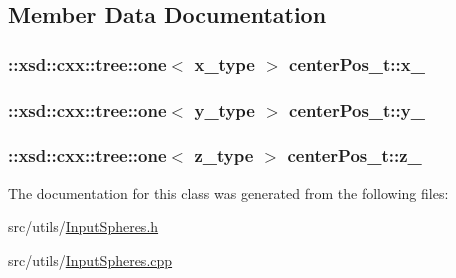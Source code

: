 \subsection{Member Data Documentation}
\hypertarget{classcenterPos__t_a17f007eddd609aec31759bf400c03dbb}{
\subsubsection[{x\-\_\-}]{\setlength{\rightskip}{0pt plus 5cm}\-::xsd\-::cxx\-::tree\-::one$<$ {\bf x\-\_\-type} $>$ center\-Pos\-\_\-t\-::x\-\_\-\hspace{0.3cm}{\ttfamily [protected]}}}\label{classcenterPos__t_a17f007eddd609aec31759bf400c03dbb}
\hypertarget{classcenterPos__t_a4e9b243a89175485826c3d57509fcaf8}{
\subsubsection[{y\-\_\-}]{\setlength{\rightskip}{0pt plus 5cm}\-::xsd\-::cxx\-::tree\-::one$<$ {\bf y\-\_\-type} $>$ center\-Pos\-\_\-t\-::y\-\_\-\hspace{0.3cm}{\ttfamily [protected]}}}\label{classcenterPos__t_a4e9b243a89175485826c3d57509fcaf8}
\hypertarget{classcenterPos__t_a51b70fc13ca57ea7638fbe292478f7de}{
\subsubsection[{z\-\_\-}]{\setlength{\rightskip}{0pt plus 5cm}\-::xsd\-::cxx\-::tree\-::one$<$ {\bf z\-\_\-type} $>$ center\-Pos\-\_\-t\-::z\-\_\-\hspace{0.3cm}{\ttfamily [protected]}}}\label{classcenterPos__t_a51b70fc13ca57ea7638fbe292478f7de}


The documentation for this class was generated from the following files\-:\begin{DoxyCompactItemize}
\item 
src/utils/\hyperlink{InputSpheres_8h}{Input\-Spheres.\-h}\item 
src/utils/\hyperlink{InputSpheres_8cpp}{Input\-Spheres.\-cpp}\end{DoxyCompactItemize}

